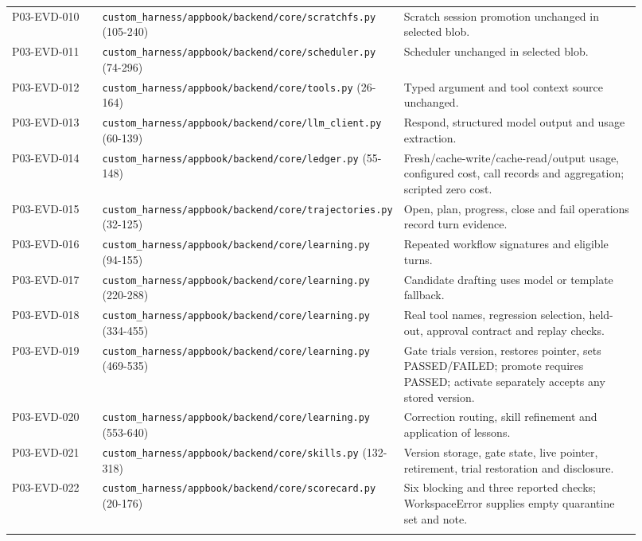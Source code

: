 \documentclass[10pt,letterpaper]{article}
\begin{document}
\begin{longtable}{@{}>{\raggedright\arraybackslash}p{0.16\linewidth}>{\raggedright\arraybackslash}p{0.34\linewidth}>{\raggedright\arraybackslash}p{0.42\linewidth}@{}}
P03-EVD-010 & \nolinkurl{custom_harness/appbook/backend/core/scratchfs.py} (105-240) & Scratch session promotion unchanged in selected blob.\\\addlinespace
P03-EVD-011 & \nolinkurl{custom_harness/appbook/backend/core/scheduler.py} (74-296) & Scheduler unchanged in selected blob.\\\addlinespace
P03-EVD-012 & \nolinkurl{custom_harness/appbook/backend/core/tools.py} (26-164) & Typed argument and tool context source unchanged.\\\addlinespace
P03-EVD-013 & \nolinkurl{custom_harness/appbook/backend/core/llm_client.py} (60-139) & Respond, structured model output and usage extraction.\\\addlinespace
P03-EVD-014 & \nolinkurl{custom_harness/appbook/backend/core/ledger.py} (55-148) & Fresh/cache-write/cache-read/output usage, configured cost, call records and aggregation; scripted zero cost.\\\addlinespace
P03-EVD-015 & \nolinkurl{custom_harness/appbook/backend/core/trajectories.py} (32-125) & Open, plan, progress, close and fail operations record turn evidence.\\\addlinespace
P03-EVD-016 & \nolinkurl{custom_harness/appbook/backend/core/learning.py} (94-155) & Repeated workflow signatures and eligible turns.\\\addlinespace
P03-EVD-017 & \nolinkurl{custom_harness/appbook/backend/core/learning.py} (220-288) & Candidate drafting uses model or template fallback.\\\addlinespace
P03-EVD-018 & \nolinkurl{custom_harness/appbook/backend/core/learning.py} (334-455) & Real tool names, regression selection, held-out, approval contract and replay checks.\\\addlinespace
P03-EVD-019 & \nolinkurl{custom_harness/appbook/backend/core/learning.py} (469-535) & Gate trials version, restores pointer, sets PASSED/FAILED; promote requires PASSED; activate separately accepts any stored version.\\\addlinespace
P03-EVD-020 & \nolinkurl{custom_harness/appbook/backend/core/learning.py} (553-640) & Correction routing, skill refinement and application of lessons.\\\addlinespace
P03-EVD-021 & \nolinkurl{custom_harness/appbook/backend/core/skills.py} (132-318) & Version storage, gate state, live pointer, retirement, trial restoration and disclosure.\\\addlinespace
P03-EVD-022 & \nolinkurl{custom_harness/appbook/backend/core/scorecard.py} (20-176) & Six blocking and three reported checks; WorkspaceError supplies empty quarantine set and note.\\\addlinespace

\end{longtable}
\end{document}
